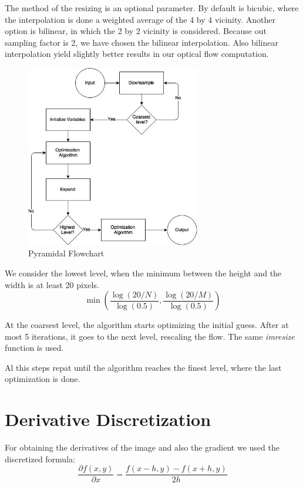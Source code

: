 \documentclass[12pt,a4paper,twoside]{report}
\begin{document}
{The method of the resizing is an optional parameter. By default is bicubic, where the interpolation is done a weighted average of the 4 by 4 vicinity. Another option is bilinear, in which the 2 by 2 vicinity is considered. Because  out sampling factor is 2, we have chosen the bilinear interpolation. Also bilinear interpolation yield slightly better results in our optical flow computation.
\begin{figure}
	\label{CTFflow}
	\centering
	\includegraphics[width = 3in]{img/ctfflow} 
	\caption{Pyramidal Flowchart}
\end{figure}

We consider the lowest level, when the minimum between the height and the width is at least  20 pixels.  
$$
\min\left(\frac{\log(20/N)}{\log(0.5)},
\frac{\log(20/M)}{\log(0.5)}\right)
$$

At the coarsest level, the algorithm starts optimizing the initial guess. After at most 5 iterations, it goes to the next level, rescaling the flow. The same \textit{imresize} function is used. 

Al this steps repat until the algorithm reaches the finest level, where the last optimization is done.  

\section{Derivative Discretization}

 For obtaining the derivatives of the image and also the gradient we used the discretized formula:
\begin{equation}
		\frac{\partial f(x, y)}{\partial x} =  \frac{f(x-h, y) - f(x+h,y)}{2h}
\end{equation}

}
\end{document}
